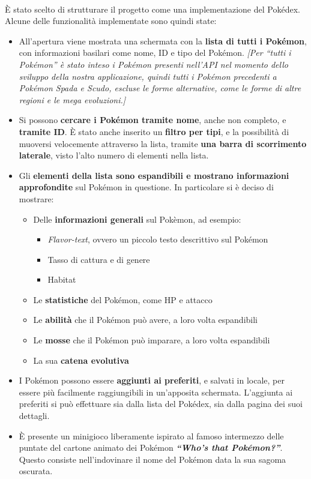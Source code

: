 \documentclass[a4paper,11pt]{article}
\begin{document}
  		\paragraph{}
  			È stato scelto di strutturare il progetto come una implementazione del Pokédex. \\ 
Alcune delle funzionalità implementate sono quindi state:
		\begin{itemize}
			\item All’apertura viene mostrata una schermata con la \textbf{lista di tutti i Pokémon}, con informazioni basilari come nome, ID e tipo del Pokémon. \textit{[Per “tutti i Pokémon” è stato inteso i Pokémon presenti nell’API nel momento dello sviluppo della nostra applicazione, quindi tutti i Pokémon precedenti a Pokémon Spada e Scudo, escluse le forme alternative, come le forme di altre regioni e le mega evoluzioni.]}
			\item Si possono \textbf{cercare i Pokémon tramite nome}, anche non completo, e \textbf{tramite ID}. È stato anche inserito un \textbf{filtro per tipi}, e la possibilità di muoversi velocemente attraverso la lista, tramite \textbf{una barra di scorrimento laterale}, visto l’alto numero di elementi nella lista.
			\item Gli \textbf{elementi della lista sono espandibili e mostrano informazioni approfondite} sul Pokémon in questione. In particolare si è deciso di mostrare:
				\begin{itemize}
					\item Delle \textbf{informazioni generali} sul Pokèmon, ad esempio:
						\begin{itemize}
							\item \textit{Flavor-text}, ovvero un piccolo testo descrittivo sul Pokémon
							\item Tasso di cattura e di genere
							\item Habitat
						\end{itemize}
					\item Le \textbf{statistiche} del Pokémon, come HP e attacco
					\item Le \textbf{abilità} che il Pokémon può avere, a loro volta espandibili
					\item Le \textbf{mosse} che il Pokémon può imparare, a loro volta espandibili	
					\item La sua \textbf{catena evolutiva}
				\end{itemize}
			\item I Pokémon possono essere \textbf{aggiunti ai preferiti}, e salvati in locale, per essere più facilmente raggiungibili in un’apposita schermata. L’aggiunta ai preferiti si può effettuare sia dalla lista del Pokédex, sia dalla pagina dei suoi dettagli.
			\item È presente un minigioco liberamente ispirato al famoso intermezzo delle puntate del cartone animato dei Pokémon \textbf{\textit{“Who's that Pokémon?”}}. Questo consiste nell’indovinare il nome del Pokémon data la sua sagoma oscurata.
		\end{itemize}\newpage
\end{document}
